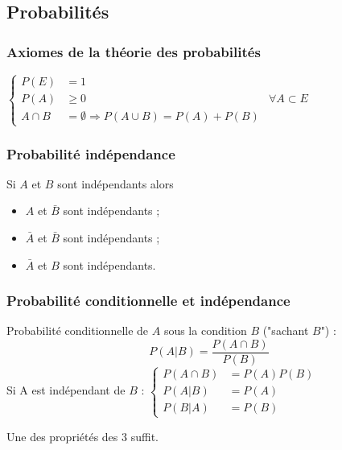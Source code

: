 \subsection{Probabilités}





\subsubsection{Axiomes de la théorie des probabilités}
\begin{center}
	$\left\{\begin{array}{LLL}
		P(E) &= 1\\
		P(A) &\geq 0&\forall A\subset E\\
		A \cap B &= \emptyset \Rightarrow P(A \cup B) = P(A)+P(B)
	\end{array}
	\right.$
\end{center}






\subsubsection{Probabilité indépendance}
Si $A$ et $B$ sont indépendants alors
\begin{itemize}
	\item $A$ et $\bar{B}$ sont indépendants ;
	\item $\bar{A}$ et $\bar{B}$ sont indépendants ;
	\item $\bar{A}$ et $B$ sont indépendants.
\end{itemize}






\subsubsection{Probabilité conditionnelle et indépendance}
Probabilité conditionnelle de $A$ sous la condition $B$ ("sachant $B$") :
$$P(A|B)=\frac{P(A \cap B)}{P(B)}$$
Si A est indépendant de $B$ :
	$\left\{\begin{array}{LL}
		P(A \cap B)&=P(A)P(B)\\
		P(A|B)&=P(A)\\
		P(B|A)&=P(B)
	\end{array}
\right.$
\begin{flushright}
Une des propriétés des 3 suffit.
\end{flushright}
